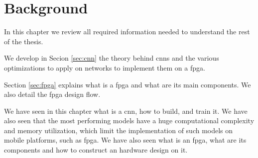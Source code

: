 \chapter{Background} \label{chap:background}
In this chapter we review all required information needed to understand the rest of the thesis.

We develop in Secion \ref{sec:cnn} the theory behind \acrshort{cnn}s and the various optimizations to apply on networks to implement them on a \acrshort{fpga}.

Section \ref{sec:fpga} explains what is a \acrshort{fpga} and what are its main components. We also detail the \acrshort{fpga} design flow.


%
\begin{tcolorbox}
    We have seen in this chapter what is a \acrshort{cnn}, how to build, and train it. We have also seen that the most performing models have a huge computational complexity and memory utilization, which limit the implementation of such models on mobile platforms, such as \acrshort{fpga}. We have also seen what is an \acrshort{fpga}, what are its components and how to construct an hardware design on it.
\end{tcolorbox}
% 
\afterpage{\blankpage}
\cleardoublepage
\newpage
